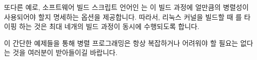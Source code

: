 또다른 예로, 소프트웨어 빌드 스크립트 언어인  는 이 빌드 과정에
얼만큼의 병렬성이 사용되어야 할지 명세하는  옵션을 제공합니다.
따라서, 리눅스 커널을 빌드할 때  를 타이핑 하는 것은 최대 네개의
빌드 과정이 동시에 수행되도록 합니다.

이 간단한 예제들을 통해 병렬 프로그래밍은 항상 복잡하거나 어려워야 할 필요는
없다는 것을 여러분이 받아들이길 바랍니다.


